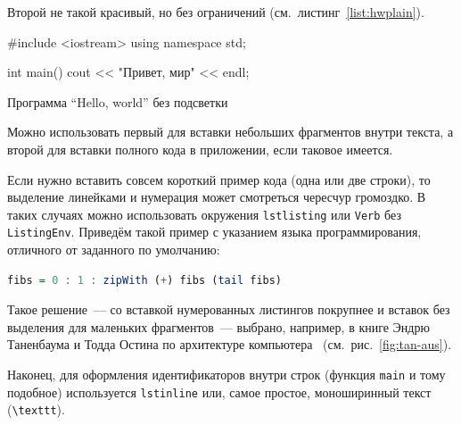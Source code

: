 Второй не такой красивый, но без ограничений (см.~листинг~\ref{list:hwplain}).
\begin{ListingEnv}[H]
\begin{Verb}

#include <iostream>
using namespace std;

int main()
{
    cout << "Привет, мир" << endl;
}
\end{Verb}
\caption{Программа “Hello, world” без подсветки}
\label{list:hwplain}
\end{ListingEnv}

Можно использовать первый для вставки небольших фрагментов
внутри текста, а второй для вставки полного
кода в приложении, если таковое имеется.

Если нужно вставить совсем короткий пример кода (одна или две строки), то выделение  линейками и нумерация может смотреться чересчур громоздко. В таких случаях можно использовать окружения \texttt{lstlisting} или \texttt{Verb} без \texttt{ListingEnv}. Приведём такой пример с указанием языка программирования, отличного от заданного по умолчанию:
\begin{lstlisting}[language=Haskell]
fibs = 0 : 1 : zipWith (+) fibs (tail fibs)
\end{lstlisting}
Такое решение~--- со вставкой нумерованных листингов покрупнее
и вставок без выделения для маленьких фрагментов~--- выбрано,
например, в книге Эндрю Таненбаума и Тодда Остина по архитектуре
компьютера~\autocite{TanAus2013} (см.~рис.~\ref{fig:tan-aus}).

Наконец, для оформления идентификаторов внутри строк
(функция \lstinline{main} и тому подобное) используется
\texttt{lstinline} или, самое простое, моноширинный текст
(\texttt{\textbackslash texttt}).

